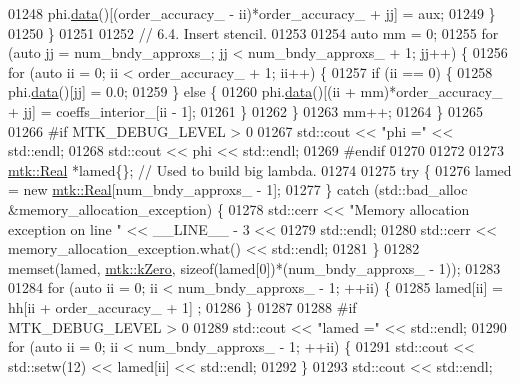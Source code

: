 \begin{DoxyCode}
{{01248         phi.\hyperlink{classmtk_1_1DenseMatrix_a0c33b8a9e01d157c61ddbdf807c25d84}{data}()[(order\_accuracy\_ - ii)*order\_accuracy\_ + jj] = aux;
01249       \}
01250     \}
01251 
01252     \textcolor{comment}{// 6.4. Insert stencil.}
01253 
01254     \textcolor{keyword}{auto} mm = 0;
01255     \textcolor{keywordflow}{for} (\textcolor{keyword}{auto} jj = num\_bndy\_approxs\_; jj < num\_bndy\_approxs\_ +  1; jj++) \{
01256       \textcolor{keywordflow}{for} (\textcolor{keyword}{auto} ii = 0; ii < order\_accuracy\_ + 1; ii++) \{
01257         \textcolor{keywordflow}{if} (ii == 0) \{
01258           phi.\hyperlink{classmtk_1_1DenseMatrix_a0c33b8a9e01d157c61ddbdf807c25d84}{data}()[jj] = 0.0;
01259         \} \textcolor{keywordflow}{else} \{
01260           phi.\hyperlink{classmtk_1_1DenseMatrix_a0c33b8a9e01d157c61ddbdf807c25d84}{data}()[(ii + mm)*order\_accuracy\_ + jj] = coeffs\_interior\_[ii - 1];
01261         \}
01262       \}
01263       mm++;
01264     \}
01265 
01266 \textcolor{preprocessor}{    #if MTK\_DEBUG\_LEVEL > 0}
01267     std::cout << \textcolor{stringliteral}{"phi ="} << std::endl;
01268     std::cout << phi << std::endl;
01269 \textcolor{preprocessor}{    #endif}
01270 
01272 
01273     \hyperlink{group__c01-roots_gac080bbbf5cbb5502c9f00405f894857d}{mtk::Real} *lamed\{\};  \textcolor{comment}{// Used to build big lambda.}
01274 
01275     \textcolor{keywordflow}{try} \{
01276       lamed = \textcolor{keyword}{new} \hyperlink{group__c01-roots_gac080bbbf5cbb5502c9f00405f894857d}{mtk::Real}[num\_bndy\_approxs\_ - 1];
01277     \} \textcolor{keywordflow}{catch} (std::bad\_alloc &memory\_allocation\_exception) \{
01278       std::cerr << \textcolor{stringliteral}{"Memory allocation exception on line "} << \_\_LINE\_\_ - 3 <<
01279         std::endl;
01280       std::cerr << memory\_allocation\_exception.what() << std::endl;
01281     \}
01282     memset(lamed, \hyperlink{group__c01-roots_ga59a451a5fae30d59649bcda274fea271}{mtk::kZero}, \textcolor{keyword}{sizeof}(lamed[0])*(num\_bndy\_approxs\_ - 1));
01283 
01284     \textcolor{keywordflow}{for} (\textcolor{keyword}{auto} ii = 0; ii < num\_bndy\_approxs\_ - 1; ++ii) \{
01285       lamed[ii] = hh[ii + order\_accuracy\_ + 1] ;
01286     \}
01287 
01288 \textcolor{preprocessor}{    #if MTK\_DEBUG\_LEVEL > 0}
01289     std::cout << \textcolor{stringliteral}{"lamed ="} << std::endl;
01290     \textcolor{keywordflow}{for} (\textcolor{keyword}{auto} ii = 0; ii < num\_bndy\_approxs\_ - 1; ++ii) \{
01291       std::cout << std::setw(12) << lamed[ii] << std::endl;
01292     \}
01293     std::cout << std::endl;
}}
\end{DoxyCode}
